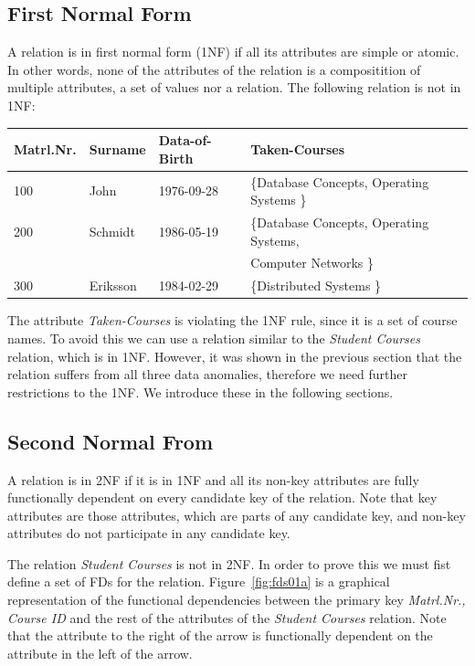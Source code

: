 \subsection{First Normal Form} 
A relation is in first normal form (1NF) if all its attributes are simple or atomic. 
In other words, none of the attributes of the relation is a compositition of multiple attributes, 
a set of values nor a relation. The following relation is not in 1NF:

\begin{center}
\begin{tabular}[h]{|l|l|l|l|}
  \hline
  Matrl.Nr. & Surname & Data-of-Birth & Taken-Courses \\ \hline
  100 & John & 1976-09-28 & \{Database Concepts, Operating Systems \} \\  
  200 & Schmidt & 1986-05-19 & \{Database Concepts, Operating Systems,  \\ 
      &         &            & Computer Networks \} \\
  300 & Eriksson & 1984-02-29 & \{Distributed Systems \} \\ \hline
\end{tabular}
\end{center}

The attribute \textit{Taken-Courses} is violating the 1NF rule, since it is a set of 
course names. To avoid this we can use a relation similar to the \textit{Student Courses} relation,
which is in 1NF. However, it was shown in the previous section that the relation suffers
from all three data anomalies, therefore we need further restrictions to the 1NF. We
introduce these in the following sections.  

\subsection{Second Normal From}
A relation is in 2NF if it is in 1NF and all its non-key attributes are fully
functionally dependent on every candidate key of the relation.
Note that key attributes are those attributes, which are parts of any 
candidate key, and non-key attributes do not participate in any candidate key. 

The relation \textit{Student Courses} is not in 2NF. In order to prove this we must
fist define a set of FDs for the relation. Figure~\ref{fig:fds01a} is a graphical representation 
of the functional dependencies between the primary key \textit{Matrl.Nr., Course ID} and the rest of the 
attributes of the \textit{Student Courses} relation. 
Note that the attribute to the right of the arrow is functionally dependent on the attribute 
in the left of the arrow.  

